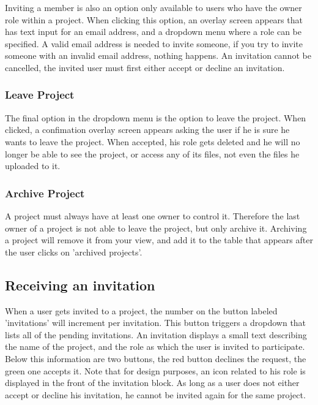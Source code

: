 Inviting a member is also an option only available to users who have the owner role within a project. When clicking this option, an overlay
screen appears that has text input for an email address, and a dropdown menu where a role can be specified. A valid email address is needed
to invite someone, if you try to invite someone with an invalid email address, nothing happens. An invitation cannot be cancelled, the 
invited user must first either accept or decline an invitation.

\subsubsection{Leave Project}

The final option in the dropdown menu is the option to leave the project. When clicked, a confimation overlay screen appears asking the user
if he is sure he wants to leave the project. When accepted, his role gets deleted and he will no longer be able to see the project, or
access any of its files, not even the files he uploaded to it. 

\subsubsection{Archive Project}

A project must always have at least one owner to control it. Therefore the last owner of a project is not able to leave the project, but only
archive it. Archiving a project will remove it from your view, and add it to the table that appears after the user clicks on 'archived projects'.

\subsection{Receiving an invitation}

When a user gets invited to a project, the number on the button labeled 'invitations' will increment per invitation. This button triggers a dropdown
that lists all of the pending invitations. An invitation displays a small text describing the name of the project, and the role as which
the user is invited to participate. Below this information are two buttons, the red button declines the request, the green one accepts it.
Note that for design purposes, an icon related to his role is displayed in the front of the invitation block. 
As long as a user does not either accept or decline his invitation, he cannot be invited again for the same project.

